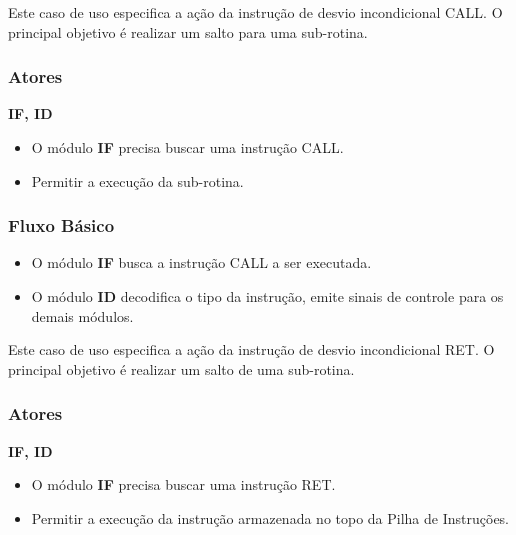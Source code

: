 
Este caso de uso especifica a ação da instrução de desvio incondicional CALL. O principal objetivo é realizar um salto para uma sub-rotina.

\subsubsection*{Atores}
\textbf{IF, ID}

\preconditions 
\begin{itemize}
	\item O módulo \textbf{IF} precisa buscar uma instrução CALL.
\end{itemize}

\postconditions
\begin{itemize}
	\item Permitir a execução da sub-rotina.
\end{itemize}

\subsubsection*{Fluxo Básico}
\begin{itemize}
	\item O módulo \textbf{IF} busca a instrução CALL a ser executada.
	\item O módulo \textbf{ID} decodifica o tipo da instrução, emite sinais de controle para os demais módulos.
\end{itemize}


Este caso de uso especifica a ação da instrução de desvio incondicional RET. O principal objetivo é realizar um salto de uma sub-rotina.

\subsubsection*{Atores}
\textbf{IF, ID}

\preconditions 
\begin{itemize}
	\item O módulo \textbf{IF} precisa buscar uma instrução RET.
\end{itemize}

\postconditions
\begin{itemize}
	\item Permitir a execução da instrução armazenada no topo da Pilha de Instruções.
\end{itemize}

